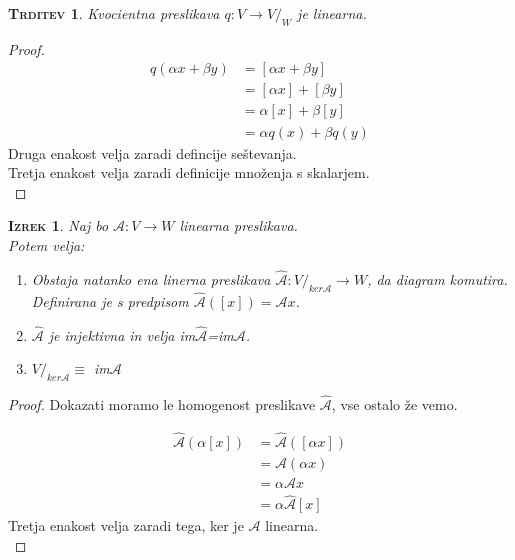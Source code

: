\documentclass[a4paper,12pt]{article}
\newcommand{\A}{\mathcal{A}}
\newtheorem*{trditev}{\textsc{Trditev}}
\newtheorem*{izrek}{\textsc{Izrek}}
\begin{document}
\begin{trditev}
	Kvocientna preslikava $q:V\to V/_W$ je linearna.\\
\end{trditev}

\begin{proof}
	\begin{align*}
		q(\alpha x + \beta y) &= [\alpha x + \beta y] \\
		&=[\alpha x]+[\beta y] \\
		&= \alpha[x]+\beta[y] \\
		&= \alpha q (x)+\beta q (y)
	\end{align*}
Druga enakost velja zaradi defincije seštevanja. \\
Tretja enakost velja zaradi definicije množenja s skalarjem.\\
\end{proof}

\newpage 

\begin{izrek}
	Naj bo $\A :V\to W$ linearna preslikava. \\ 

	Potem velja:
	\begin{enumerate}
		\item Obstaja natanko ena linerna preslikava $\hat{\A} : V/_{ker \A} \to W$, da diagram komutira.  \linebreak  Definirana je s predpisom $\hat{\A} ([x])=\A x$.
		\item $\hat{\A}$ je injektivna in velja im$\hat{\A}$=im$\A$.
		\item $V/_{ker \A}\equiv$ im$\A$\\
		\end{enumerate}
	
\end{izrek}

\begin{proof}
	Dokazati moramo le homogenost preslikave $\hat{\A}$, vse ostalo že vemo.

	\begin{align*}
		\hat{\A}(\alpha[x])&=\hat{\A}([\alpha x]) \\
		&= \A (\alpha x) \\
		&= \alpha \A x \\
		&= \alpha \hat{\A} [x]
	\end{align*}
	Tretja enakost velja zaradi tega, ker je $\A$ linearna. \\
\end{proof}
\end{document}
